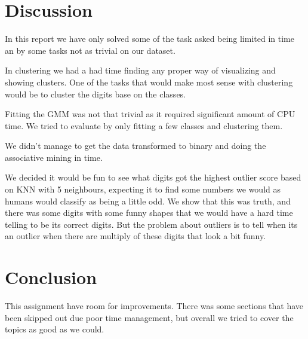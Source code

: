 \chapter{Discussion}
In this report we have only solved some of the task asked being limited in time an by some tasks not as trivial on our dataset. 

In clustering we had a had time finding any proper way of visualizing and showing clusters. One of the tasks that would make most sense with clustering would be to cluster the digits base on the classes. 

Fitting the GMM was not that trivial as it required significant amount of CPU time. We tried to evaluate by only fitting a few classes and clustering them. 

We didn't manage to get the data transformed to binary and doing the associative mining in time.

We decided it would be fun to see what digits got the highest outlier score based on KNN with 5 neighbours, expecting it to find some numbers we would as humans would classify as being a little odd. We show that this was truth, and there was some digits with some funny shapes that we would have a hard time telling to be its correct digits. But the problem about outliers is to tell when its an outlier when there are multiply of these digits that look a bit funny. 

 
\chapter{Conclusion}
This assignment have room for improvements. There was some sections that have been skipped out due poor time management, but overall we tried to cover the topics as good as we could.
